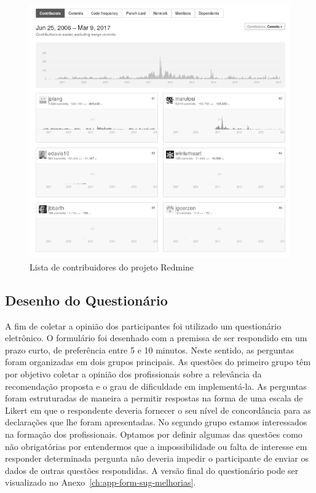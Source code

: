 \begin{figure}[htpb]
	\centering
	\includegraphics[width=0.8\linewidth]{./chapter-sugestoes-melhorias-fgrm/img/redmine_contribuidores.png}
	\caption{Lista de contribuidores do projeto Redmine}
\label{fig:redmine_contribuidores}
\end{figure}

\subsection{Desenho do Questionário}
\label{ssub:sug_melhoria_desenho_questionario}

A fim de coletar a opinião dos participantes foi utilizado um questionário
eletrônico. O formulário foi desenhado com a premissa de ser respondido em um
prazo curto, de preferência entre 5 e 10 minutos. Neste sentido, as perguntas
foram organizadas em dois grupos principais. As questões do primeiro grupo têm
por objetivo coletar a opinião dos profissionais sobre a relevância da
recomendação proposta e o grau de dificuldade em implementá-la. As perguntas
foram estruturadas de maneira a permitir respostas na forma de uma escala de
Likert em que o respondente deveria fornecer o seu nível de concordância para as
declarações que lhe foram apresentadas. No segundo grupo estamos interessados na
formação dos profissionais. Optamos por definir algumas das questões como não
obrigatórias por entendermos que a impossibilidade ou falta de interesse em
responder determinada pergunta não deveria impedir o participante de enviar os
dados de outras questões respondidas. A versão final do questionário pode ser
visualizado no Anexo~\ref{ch:app-form-sug-melhorias}.

